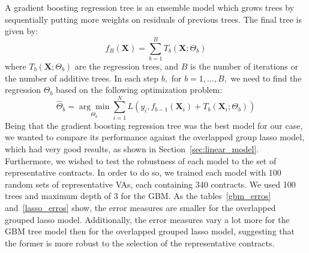 
A gradient boosting regression tree is an ensemble model which grows trees by sequentially putting more weights on residuals of previous trees. The final tree is given by:    
$$f_{B}(\mathbf{X})=\sum_{b=1}^{B} T_{b}\left(\mathbf{X} ; \Theta_{b}\right)$$
where $T_{b}\left(\mathbf{X} ; \Theta_{b}\right)$ are the regression trees, and $B$ is the number of iterations or the number of additive trees. In each step $b,$ for $b=1, \ldots, B,$ we need to find the regression $\Theta_{b}$ based on the following optimization problem:
	$$\hat{\Theta}_{b}=\underset{\Theta_{b}}{\arg \min } \sum_{i=1}^{N} L\left(y_{i}, f_{b-1}\left(\mathbf{X}_{i}\right)+T_{b}\left(\mathbf{X}_{i} ; \Theta_{b}\right)\right)$$
Being that the gradient boosting regression tree was the best model for our case, we wanted to compare its performance against the overlapped group lasso model, which had very good results, as shown in Section~\ref{sec:linear_model}. Furthermore, we wished to test the robustness of each model to the set of representative contracts. In order to do so, we trained each model with 100 random sets of representative VAs, each containing 340 contracts. We used 100 trees and maximum depth of 3 for the GBM. 
As the tables~\ref{gbm_erros} and~\ref{lasso_erros} show, the error measures are smaller for the overlapped grouped lasso model. Additionally, the error measures vary a lot more for the GBM tree model then for the overlapped grouped lasso model, suggesting that the former is more robust to the selection of the representative contracts.

